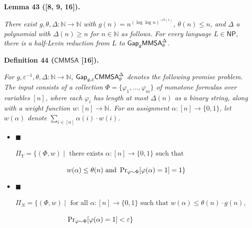\documentclass[10pt,a4paper]{article}
\begin{document}




\par\medskip\noindent\textbf{
\textbf{Lemma 43}\textbf{ }([8, 9, 16])\textbf{.}
}\par



\emph{There exist $g,\theta,\Delta:\mathbb{N}\to\mathbb{N}$ with $g(n)=n^{(\log\log n)^{-O(1)}}$, $\theta(n)\leq n$, and $\Delta$ a polynomial with $\Delta(n)\geq n$ for $n\in\mathbb{N}$ as follows. For every language $L\in{\mathsf{NP}}$, there is a half-Levin reduction from $L$ to ${\sf Gap}_{g}{\mathsf{MMSA}}^{\Delta}_{\theta}$.}\par







\par\medskip\noindent\textbf{
\textbf{Definition 44}\textbf{ }(${\mathsf{CMMSA}}$ [16])\textbf{.}
}\par



\emph{For $g,\varepsilon^{-1},\theta,\Delta:\mathbb{N}\to\mathbb{N}$, ${\sf Gap}_{g,\varepsilon}{\mathsf{CMMSA}}^{\Delta}_{\theta}$ denotes the following promise problem. The input consists of a collection $\Phi=\{\varphi_{1},...,\varphi_{m}\}$ of monotone formulas over variables $[n]$, where each $\varphi_{i}$ has length at most $\Delta(n)$ as a binary string, along with a weight function $w:[n]\to\mathbb{N}$. For an assignment $\alpha:[n]\to\{0,1\}$, let $w(\alpha)$ denote $\sum_{i\in[n]}\alpha(i)\cdot w(i)$.}\par


\begin{itemize}


\item[] 
$\blacksquare$ 


$\Pi_{Y}=\{(\Phi,w)\mid\text{ there exists }\alpha:[n]\to\{0,1\}\text{ such that }$\emph{
}

$\phantom{x}\hskip 68.88867ptw(\alpha)\leq\theta(n)\text{ and }\Pr_{\varphi\sim\Phi}[\varphi(\alpha)=1]=1\}$\emph{}\par





\item[] 
$\blacksquare$ 


$\Pi_{N}=\{(\Phi,w)\mid\text{ for all }\alpha:[n]\to\{0,1\}\text{ such that }w(\alpha)\leq\theta(n)\cdot g(n)\text{, }$\emph{
}

$\phantom{x}\hskip 68.88867pt\Pr_{\varphi\sim\Phi}[\varphi(\alpha)=1]<\varepsilon\}$\emph{}\par





\end{itemize}
\end{document}
